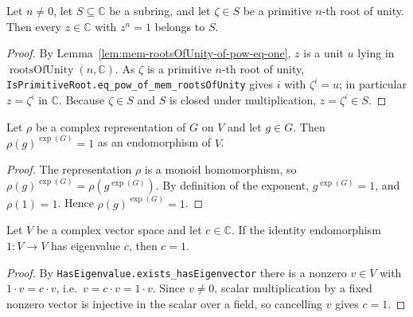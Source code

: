 \begin{lemma}
    \label{lem:rootsOfUnity-mem}
    \leanok
    Let $n \neq 0$, let $S \subseteq \mathbb{C}$ be a subring, and let
    $\zeta \in S$ be a primitive $n$-th root of unity. Then every $z \in
    \mathbb{C}$ with $z^n = 1$ belongs to $S$.
\end{lemma}
\begin{proof}
    By Lemma~\ref{lem:mem-rootsOfUnity-of-pow-eq-one}, $z$ is a unit $u$ lying in
    $\operatorname{rootsOfUnity}(n, \mathbb{C})$. As $\zeta$ is a primitive $n$-th
    root of unity, \texttt{IsPrimitiveRoot.eq\_pow\_of\_mem\_rootsOfUnity} gives
    $i$ with $\zeta^i = u$; in particular $z = \zeta^i$ in $\mathbb{C}$. Because
    $\zeta \in S$ and $S$ is closed under multiplication, $z = \zeta^i \in S$.
\end{proof}

\begin{lemma}
    \label{lem:rho-pow-exponent}
    \leanok
    Let $\rho$ be a complex representation of $G$ on $V$ and let $g \in G$. Then
    $\rho(g)^{\exp(G)} = 1$ as an endomorphism of $V$.
\end{lemma}
\begin{proof}
    The representation $\rho$ is a monoid homomorphism, so
    $\rho(g)^{\exp(G)} = \rho(g^{\exp(G)})$. By definition of the exponent,
    $g^{\exp(G)} = 1$, and $\rho(1) = 1$. Hence $\rho(g)^{\exp(G)} = 1$.
\end{proof}

\begin{lemma}
    \label{lem:eigenvalue-id-eq-one}
    \leanok
    Let $V$ be a complex vector space and let $c \in \mathbb{C}$. If the identity
    endomorphism $1 : V \to V$ has eigenvalue $c$, then $c = 1$.
\end{lemma}
\begin{proof}
    By \texttt{HasEigenvalue.exists\_hasEigenvector} there is a nonzero $v \in V$
    with $1 \cdot v = c \cdot v$, i.e.\ $v = c \cdot v = 1 \cdot v$. Since $v \neq
    0$, scalar multiplication by a fixed nonzero vector is injective in the scalar
    over a field, so cancelling $v$ gives $c = 1$.
\end{proof}

